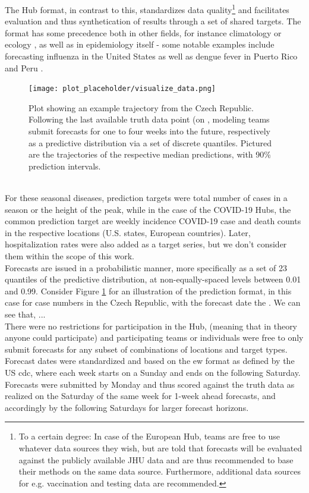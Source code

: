 The Hub format, in contrast to this, standardizes data quality\footnote{To a certain degree: In case of the European Hub, teams are free to use whatever data sources they wish, but are told that forecasts will be evaluated against the publicly available JHU data and are thus recommended to base their methods on the same data source. Furthermore, additional data sources for e.g. vaccination and testing data are recommended.} and facilitates evaluation and thus synthetication of results through a set of shared targets. The format has some precedence both in other fields, for instance climatology or ecology \citep{warszawski_inter-sectoral_2014}, as well as in epidemiology itself - some notable examples include forecasting influenza in the United States \citep{reich_collaborative_2019} as well as dengue fever in Puerto Rico and Peru \citep{johansson_open_2019}. 
\begin{figure}
\texttt{[image: plot\_placeholder/visualize\_data.png]}
\caption{ Plot showing an example trajectory from the Czech Republic. Following the last available truth data point (on , modeling teams submit forecasts for one to four weeks into the future, respectively as a predictive distribution via a set of discrete quantiles. Pictured are the trajectories of the respective median predictions, with 90\% prediction intervals.}
\label{fig:czech_predictions}
\end{figure} \\
For these seasonal diseases, prediction targets were total number of cases in a season or the height of the peak, while in the case of the COVID-19 Hubs, the common prediction target are weekly incidence COVID-19 case and death counts in the respective locations (U.S. states, European countries). Later, hospitalization rates were also added as a target series, but we don't consider them within the scope of this work.\\ Forecasts are issued in a probabilistic manner, more specifically as a set of 23 quantiles of the predictive distribution, at non-equally-spaced levels between 0.01 and 0.99. Consider Figure \ref{fig:czech_predictions} for an illustration of the prediction format, in this case for case numbers in the Czech Republic, with the forecast date the . We can see that, ...\\ 
There were no restrictions for participation in the Hub, (meaning that in theory anyone could participate) and participating teams or individuals were free to only submit forecasts for any subset of combinations of locations and target types. Forecast dates were standardized and based on the \ac{ew} format as defined by the US \ac{cdc}, where each week starts on a Sunday and ends on the following Saturday. Forecasts were submitted by Monday and thus scored against the truth data as realized on the Saturday of the same week for 1-week ahead forecasts, and accordingly by the following Saturdays for larger forecast horizons.\\ 
